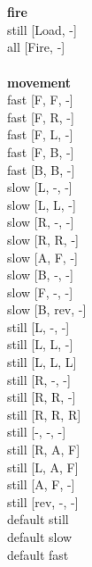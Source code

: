  
\ \\




\ \\ {\bf fire } \\
still [Load, -] \\
all [Fire, -] \\
\ \\ {\bf movement } \\
fast [F, F, -] \\
fast [F, R, -] \\
fast [F, L, -] \\
fast [F, B, -] \\
fast [B, B, -] \\
slow [L, -, -] \\
slow [L, L, -] \\
slow [R, -, -] \\
slow [R, R, -] \\
slow [A, F, -] \\
slow [B, -, -] \\
slow [F, -, -] \\
slow [B, rev, -] \\
still [L, -, -] \\
still [L, L, -] \\
still [L, L, L] \\
still [R, -, -] \\
still [R, R, -] \\
still [R, R, R] \\
still [-, -, -] \\
still [R, A, F] \\
still [L, A, F] \\
still [A, F, -] \\
still [rev, -, -] \\
default still \\
default slow \\
default fast \\



